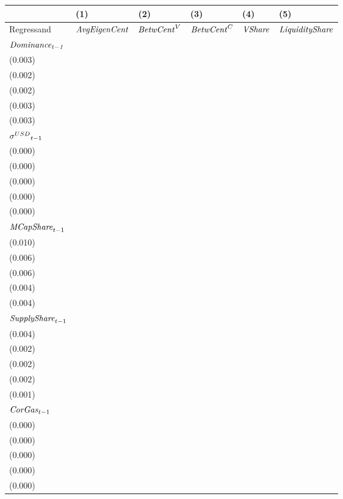 \begin{tabular}{llllll}
\toprule
{} &                                  (1) &                                  (2) &                                   (3) &                                  (4) &                                   (5) \\
\midrule
Regressand                   &                 ${\it AvgEigenCent}$ &                   ${\it BetwCent}^V$ &                    ${\it BetwCent}^C$ &                       ${\it VShare}$ &                ${\it LiquidityShare}$ \\
$\it Dominance_{t-1}$        &  \makecell{$0.693^{***}$ \\ (0.003)} &  \makecell{$0.937^{***}$ \\ (0.002)} &   \makecell{$0.899^{***}$ \\ (0.002)} &  \makecell{$0.805^{***}$ \\ (0.003)} &   \makecell{$0.770^{***}$ \\ (0.003)} \\
${{\it \sigma}^{USD}}_{t-1}$ &     \makecell{$0.000^{}$ \\ (0.000)} &    \makecell{$-0.000^{}$ \\ (0.000)} &      \makecell{$0.000^{}$ \\ (0.000)} &    \makecell{$-0.000^{}$ \\ (0.000)} &     \makecell{$-0.000^{}$ \\ (0.000)} \\
${{\it MCapShare}}_{t-1}$    &     \makecell{$0.006^{}$ \\ (0.010)} &  \makecell{$0.059^{***}$ \\ (0.006)} &   \makecell{$0.088^{***}$ \\ (0.006)} &  \makecell{$0.067^{***}$ \\ (0.004)} &   \makecell{$0.145^{***}$ \\ (0.004)} \\
${{\it SupplyShare}}_{t-1}$  &  \makecell{$0.063^{***}$ \\ (0.004)} &     \makecell{$0.000^{}$ \\ (0.002)} &   \makecell{$-0.005^{**}$ \\ (0.002)} &  \makecell{$0.018^{***}$ \\ (0.002)} &  \makecell{$-0.005^{***}$ \\ (0.001)} \\
${{\it CorGas}}_{t-1}$       &     \makecell{$0.000^{}$ \\ (0.000)} &    \makecell{$-0.000^{}$ \\ (0.000)} &      \makecell{$0.000^{}$ \\ (0.000)} &    \makecell{$-0.000^{}$ \\ (0.000)} &     \makecell{$-0.000^{}$ \\ (0.000)} \\

\end{tabular}

